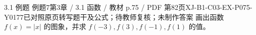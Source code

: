 \par\noindent\begin{minipage}{\linewidth}
\begin{bankitem}{3.1 例题 例题7}{第3章 / 3.1 函数 / 教材 p.75 / PDF 第82页}{XJ-B1-C03-EX-P075-Y0177}{已对照原页转写题干及公式；待教师复核；未制作答案}
画出函数 $f(x)=|x|$ 的图象，并求 $f(-3),f(3),f(-1),f(1)$ 的值。
\end{bankitem}
\end{minipage}\par\medskip
